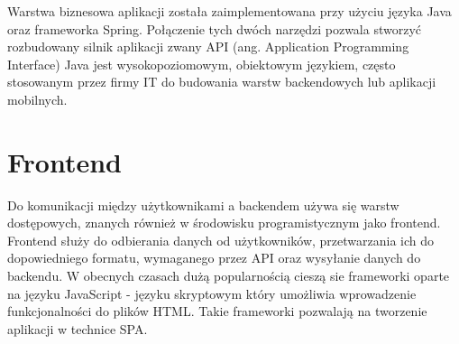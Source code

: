 Warstwa biznesowa aplikacji została zaimplementowana przy użyciu języka Java oraz frameworka Spring. Połączenie tych dwóch narzędzi pozwala stworzyć rozbudowany silnik aplikacji zwany API (ang. Application Programming Interface)
Java jest wysokopoziomowym, obiektowym językiem, często stosowanym przez firmy IT do budowania warstw backendowych lub aplikacji mobilnych. 




\section{Frontend}
Do komunikacji między użytkownikami a backendem używa się warstw dostępowych, znanych również w środowisku programistycznym jako frontend. Frontend służy do odbierania danych od użytkowników, przetwarzania ich do dopowiedniego formatu, wymaganego przez API oraz wysyłanie danych do backendu. W obecnych czasach dużą popularnością cieszą sie frameworki oparte na języku JavaScript - języku skryptowym który umożliwia wprowadzenie funkcjonalności do plików HTML. Takie frameworki pozwalają na tworzenie aplikacji w technice SPA.

